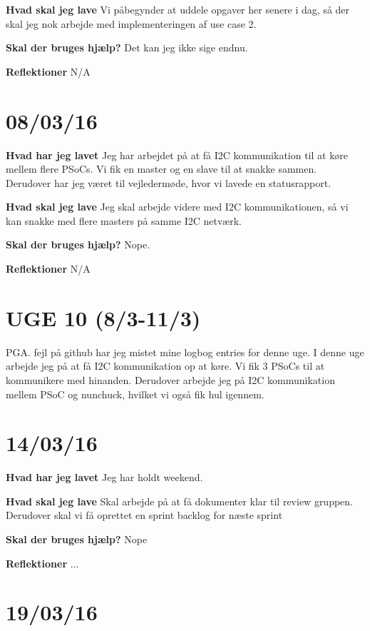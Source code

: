\documentclass{article}
\begin{document}
	\textbf{Hvad skal jeg lave}
	Vi påbegynder at uddele opgaver her senere i dag, så der skal jeg nok arbejde med implementeringen af use case 2.
	
	\textbf{Skal der bruges hjælp?}
	Det kan jeg ikke sige endnu.
	
	\textbf{Reflektioner}
	N/A
	
	
	\section{08/03/16}
	
	\textbf{Hvad har jeg lavet}
	Jeg har arbejdet på at få I2C kommunikation til at køre mellem flere PSoCs. Vi fik en master og en slave til at snakke sammen. Derudover har jeg været til vejledermøde, hvor vi lavede en statusrapport.
	
	\textbf{Hvad skal jeg lave}
	Jeg skal arbejde videre med I2C kommunikationen, så vi kan snakke med flere masters på samme I2C netværk.
	
	\textbf{Skal der bruges hjælp?}
	Nope.
	
	\textbf{Reflektioner}
	N/A
	
	
	\section{UGE 10 (8/3-11/3)}
	
	PGA. fejl på github har jeg mistet mine logbog entries for denne uge. I denne uge arbejde jeg på at få I2C kommunikation op at køre. Vi fik 3 PSoCs til at kommunikere med hinanden. Derudover arbejde jeg på I2C kommunikation mellem PSoC og nunchuck, hvilket vi også fik hul igennem.
	
	
	
	
	\section{14/03/16}
	
	\textbf{Hvad har jeg lavet}
	Jeg har holdt weekend.
	
	\textbf{Hvad skal jeg lave}
	Skal arbejde på at få dokumenter klar til review gruppen. Derudover skal vi få oprettet en sprint backlog for næste sprint
	
	\textbf{Skal der bruges hjælp?}
	Nope
	
	\textbf{Reflektioner}
	...
	
	\section{19/03/16}
	
\end{document}

